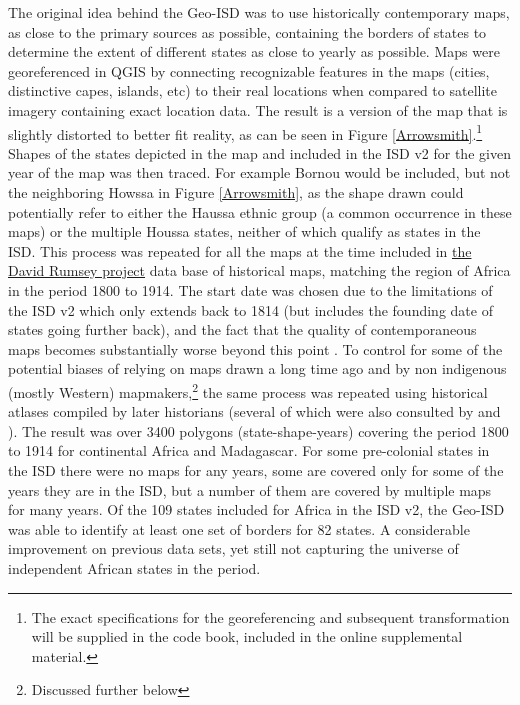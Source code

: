 \documentclass[12pt]{article}
\begin{document}
The original idea behind the Geo-ISD was to use historically contemporary maps,
as close to the primary sources as possible, containing the borders of states to
determine the extent of different states as close to yearly as possible. Maps
were georeferenced in QGIS by connecting recognizable features in the maps
(cities, distinctive capes, islands, etc) to their real locations when compared
to satellite imagery containing exact location data.  The result is a version of
the map that is slightly distorted to better fit reality, as can be seen in
Figure \ref{Arrowsmith}.\footnote{The exact specifications for the
georeferencing and subsequent transformation will be supplied in the code book,
included in the online supplemental material.} Shapes of the states depicted in the map and
included in the ISD v2 for the given year of the map was then traced. For
example Bornou would be included, but not the neighboring Howssa in Figure
\ref{Arrowsmith}, as the shape drawn could potentially refer to either the
Haussa ethnic group (a common occurrence in these maps) or the multiple Houssa
states, neither of which qualify as states in the ISD. This process was repeated
for all the maps at the time included in \href{https://www.davidrumsey.com}{the
David Rumsey project} data base of historical maps, matching the region of
Africa in the period 1800 to 1914. The start date was chosen due to the
limitations of the ISD v2 which only extends back to 1814 (but includes the
founding date of states going further back), and the fact that the quality of
contemporaneous maps becomes substantially  worse beyond this point
\citep{Bassett_1994}. To control for some of the potential biases of relying on
maps drawn a long time ago and by non indigenous (mostly Western)
mapmakers,\footnote{Discussed further below} the same process was repeated using
historical atlases compiled by later historians (several of which were also
consulted by \citet{Depetris-Chauvin2016} and \citet{Paine2019}). The result was
over 3400 polygons (state-shape-years) covering the period 1800 to 1914 for
continental Africa and Madagascar. For some pre-colonial states in the ISD there
were no maps for any years, some are covered only for some of the years they are
in the ISD, but a number of them are covered by multiple maps for many years. Of
the 109 states included for Africa in the ISD v2, the Geo-ISD was able to
identify at least one set of borders for 82 states. A considerable improvement
on previous data sets, yet still not capturing the universe of independent
African states in the period.
\end{document}
